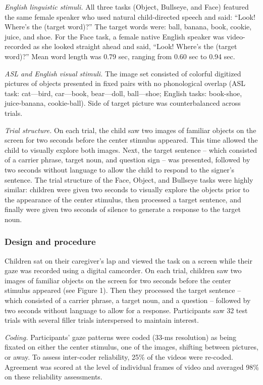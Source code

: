 \documentclass[english,floatsintext,man]{apa6}
\theoremstyle{definition}
\theoremstyle{definition}
\theoremstyle{definition}
\theoremstyle{remark}
\begin{document}
\emph{English linguistic stimuli.} All three tasks (Object, Bullseye,
and Face) featured the same female speaker who used natural
child-directed speech and said: \enquote{Look! Where's the (target
word)?} The target words were: ball, banana, book, cookie, juice, and
shoe. For the Face task, a female native English speaker was
video-recorded as she looked straight ahead and said, \enquote{Look!
Where's the (target word)?} Mean word length was 0.79 sec, ranging from
0.60 sec to 0.94 sec.

\emph{ASL and English visual stimuli.} The image set consisted of
colorful digitized pictures of objects presented in fixed pairs with no
phonological overlap (ASL task: cat---bird, car---book, bear---doll,
ball---shoe; English tasks: book-shoe, juice-banana, cookie-ball). Side
of target picture was counterbalanced across trials.

\emph{Trial structure.} On each trial, the child saw two images of
familiar objects on the screen for two seconds before the center
stimulus appeared. This time allowed the child to visually explore both
images. Next, the target sentence -- which consisted of a carrier
phrase, target noun, and question sign -- was presented, followed by two
seconds without language to allow the child to respond to the signer's
sentence. The trial structure of the Face, Object, and Bullseye tasks
were highly similar: children were given two seconds to visually explore
the objects prior to the appearance of the center stimulus, then
processed a target sentence, and finally were given two seconds of
silence to generate a response to the target noun.

\hypertarget{design-and-procedure}{%
\subsubsection{Design and procedure}\label{design-and-procedure}}

Children sat on their caregiver's lap and viewed the task on a screen
while their gaze was recorded using a digital camcorder. On each trial,
children saw two images of familiar objects on the screen for two
seconds before the center stimulus appeared (see Figure 1). Then they
processed the target sentence -- which consisted of a carrier phrase, a
target noun, and a question -- followed by two seconds without language
to allow for a response. Participants saw 32 test trials with several
filler trials interspersed to maintain interest.

\emph{Coding.} Participants' gaze patterns were coded (33-ms resolution)
as being fixated on either the center stimulus, one of the images,
shifting between pictures, or away. To assess inter-coder reliability,
25\% of the videos were re-coded. Agreement was scored at the level of
individual frames of video and averaged 98\% on these reliability
assessments.
\end{document}
